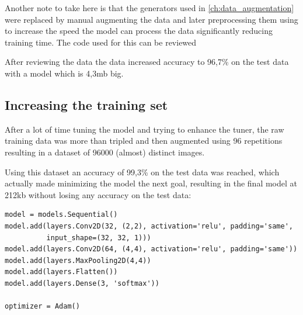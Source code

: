 Another note to take here is that the generators used in \ref{ch:data_augmentation} were replaced by manual augmenting the data and later preprocessing them using  %
to increase the speed the model can process the data significantly reducing training time.
The code used for this can be reviewed %

After reviewing the data the data increased accuracy to 96,7\% on the test data with a model which is 4,3mb big.

\subsection{Increasing the training set}

After a lot of time tuning the model and trying to enhance the tuner, the raw training data was more than tripled and then augmented using 96 repetitions resulting in a dataset of 96000 (almost) distinct images.

Using this dataset an accuracy of 99,3\% on the test data was reached, which actually made minimizing the model the next goal, resulting in the final model at 212kb without losing any accuracy on the test data:


\begin{lstlisting}
model = models.Sequential()
model.add(layers.Conv2D(32, (2,2), activation='relu', padding='same',
          input_shape=(32, 32, 1)))
model.add(layers.Conv2D(64, (4,4), activation='relu', padding='same'))
model.add(layers.MaxPooling2D(4,4))
model.add(layers.Flatten())
model.add(layers.Dense(3, 'softmax'))

optimizer = Adam()
\end{lstlisting}